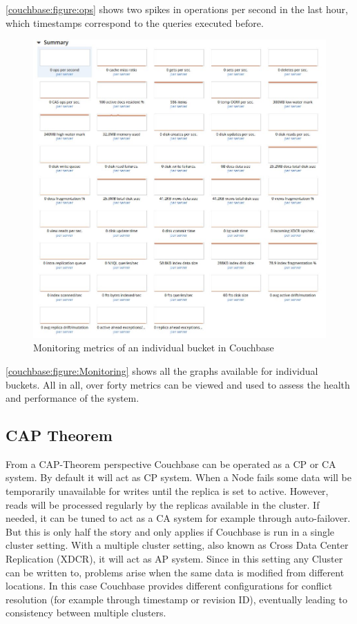 \autoref{couchbase:figure:ops} shows two spikes in operations per second in the last hour, which timestamps correspond to the queries executed before.

\begin{figure}[H]
    \centering
    \includegraphics[width=\textwidth]{img/couchbaseMonitor.jpg}
    \caption{Monitoring metrics of an individual bucket in Couchbase}
    \label{couchbase:figure:Monitoring}
\end{figure}

\autoref{couchbase:figure:Monitoring} shows all the graphs available for individual buckets. All in all, over forty metrics can be viewed and used to assess the health and performance of the system.

\subsection{CAP Theorem}
From a CAP-Theorem perspective Couchbase can be operated as a CP or CA system. By default it will act as CP system. When a Node fails some data will be temporarily unavailable for writes until the replica is set to active. However, reads will be processed regularly by the replicas available in the cluster. If needed, it can be tuned to act as a CA system for example through auto-failover. But this is only half the story and only applies if Couchbase is run in a single cluster setting. With a multiple cluster setting, also known as Cross Data Center Replication (XDCR), it will act as AP system. Since in this setting any Cluster can be written to, problems arise when the same data is modified from different locations. In this case Couchbase provides different configurations for conflict resolution (for example through timestamp or revision ID), eventually leading to consistency between multiple clusters. \parencite{couchbaseCAP}

